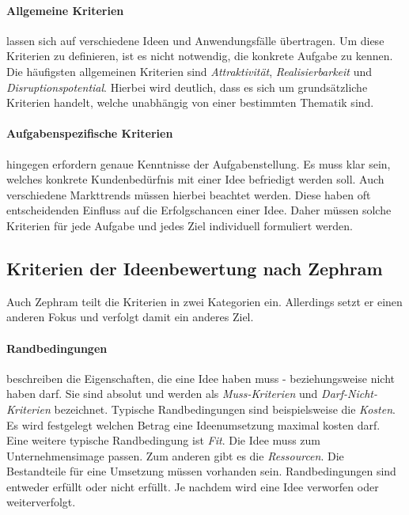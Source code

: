 \paragraph{Allgemeine Kriterien} lassen sich auf verschiedene Ideen und Anwendungsfälle übertragen.
Um diese Kriterien zu definieren, ist es nicht notwendig, die konkrete Aufgabe zu kennen. 
Die häufigsten allgemeinen Kriterien sind \textit{Attraktivität}, \textit{Realisierbarkeit} und 
\textit{Disruptionspotential}. Hierbei wird deutlich, dass es sich um grundsätzliche Kriterien handelt, 
welche unabhängig von einer bestimmten Thematik sind.\\
\paragraph{Aufgabenspezifische Kriterien} hingegen erfordern genaue Kenntnisse der Aufgabenstellung. Es muss klar sein, welches 
konkrete Kundenbedürfnis mit einer Idee befriedigt werden soll. Auch verschiedene Markttrends müssen hierbei beachtet werden. 
Diese haben oft entscheidenden Einfluss auf die Erfolgschancen einer Idee. Daher müssen solche Kriterien für jede Aufgabe und jedes Ziel 
individuell formuliert werden.
\cite{grossklaus:2008}

\subsection{Kriterien der Ideenbewertung nach Zephram}
Auch Zephram \cite{zephram:2018} teilt die Kriterien in zwei Kategorien ein. Allerdings setzt er einen anderen Fokus und verfolgt 
damit ein anderes Ziel.

\paragraph{Randbedingungen} beschreiben die Eigenschaften, die eine Idee haben muss - 
beziehungsweise nicht haben darf. Sie sind absolut und werden als \textit{Muss-Kriterien}
und \textit{Darf-Nicht-Kriterien} bezeichnet.
Typische Randbedingungen sind beispielsweise die \textit{Kosten}. 
Es wird festgelegt welchen Betrag eine Ideenumsetzung maximal kosten darf. 
Eine weitere typische Randbedingung ist \textit{Fit}. Die Idee muss zum Unternehmensimage passen. Zum anderen 
gibt es die \textit{Ressourcen}. Die Bestandteile für eine Umsetzung müssen vorhanden sein. 
Randbedingungen sind entweder erfüllt oder nicht erfüllt. Je nachdem wird eine Idee verworfen oder weiterverfolgt. 

